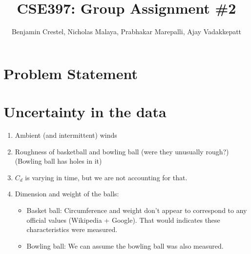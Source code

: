 \documentclass{article}
\title{\bf{CSE397: Group Assignment \#2}}
\author{Benjamin Crestel, Nicholas Malaya, Prabhakar Marepalli, Ajay Vadakkepatt}
\date{}
\begin{document}
\maketitle

\newpage
\section*{Problem Statement}

\section{Uncertainty in the data}
\begin{enumerate}
 \item Ambient (and intermittent) winds
 \item Roughness of basketball and bowling ball (were they unusually
       rough?) (Bowling ball has holes in it)
 \item $C_d$ is varying in time, but we are not accounting for that.
 \item Dimension and weight of the balls:
\begin{itemize}
 \item Basket ball: Circumference and weight don't appear to correspond to any official values (Wikipedia + Google). That would indicates these characteristics were measured.
 \item Bowling ball: We can assume the bowling ball was also measured.
\end{itemize}


\end{enumerate}
\end{document}
